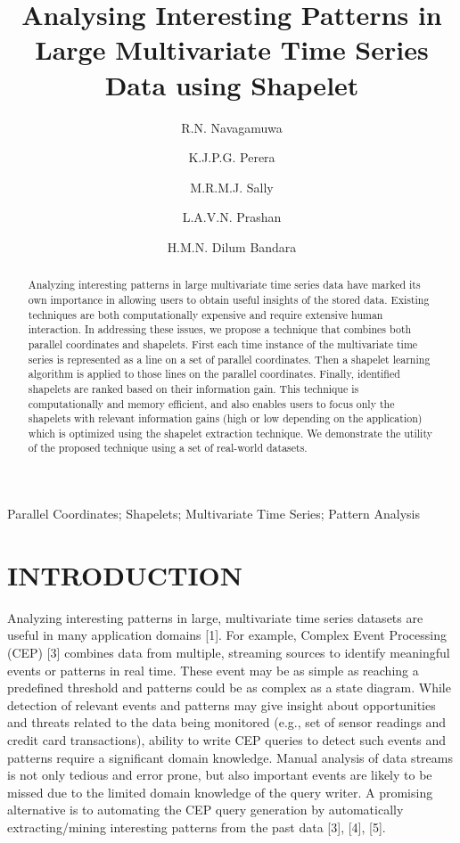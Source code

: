 \documentclass[letterpaper, 10 pt, conference]{IEEEtran}  %
\title{\LARGE \bf
Analysing Interesting Patterns in Large Multivariate Time Series Data using Shapelet
}
\author{R.N. Navagamuwa}
\author{K.J.P.G. Perera}
\author{M.R.M.J. Sally}
\author{L.A.V.N. Prashan}
\author{H.M.N. Dilum Bandara}
\affil[1]{Department of Computer Science and Engineering\protect\\ University Of Moratuwa\protect\\ Katubedda, Sri Lanka \authorcr Email: {\tt (randika.12, jaward.12, pravinda.12, prashan.12, dilumb)@cse.mrt.ac.lk} \vspace{-2ex}}
\begin{document}
\graphicspath{ {images/} }


\maketitle
\thispagestyle{empty}
\pagestyle{empty}


\begin{abstract}

Analyzing interesting patterns in large multivariate time series data have marked its own importance in allowing users to obtain useful insights of the stored data. Existing techniques are both computationally expensive and require extensive human interaction. In addressing these issues, we propose a technique that combines both parallel coordinates and shapelets. First each time instance of the multivariate time series is represented as a line on a set of parallel coordinates. Then a shapelet learning algorithm is applied to those lines on the parallel coordinates. Finally, identified shapelets are ranked based on their information gain.  This technique is computationally and memory efficient, and also enables users to focus only the shapelets with relevant information gains (high or low depending on the application) which is optimized using the shapelet extraction technique.  We demonstrate the utility of the proposed technique using a set of real-world datasets. 

\end{abstract}

\begin{IEEEkeywords} 
Parallel Coordinates;  Shapelets; Multivariate Time Series; Pattern Analysis 
\end{IEEEkeywords}

\section{INTRODUCTION}

Analyzing interesting patterns in large, multivariate time series datasets are useful in many application domains [1]. For example, Complex Event Processing (CEP) [3] combines data from multiple, streaming sources to identify meaningful events or patterns in real time. These event may be as simple as reaching a predefined threshold and patterns could be as complex as a state diagram. While detection of relevant events and patterns may give insight about opportunities and threats related to the data being monitored (e.g., set of sensor readings and credit card transactions), ability to write CEP queries to detect such events and patterns require a significant domain knowledge. Manual analysis of data streams is not only tedious and error prone, but also important events are likely to be missed due to the limited domain knowledge of the query writer. A promising alternative is to automating the CEP query generation by automatically extracting/mining interesting patterns from the past data [3], [4], [5].
\end{document}
